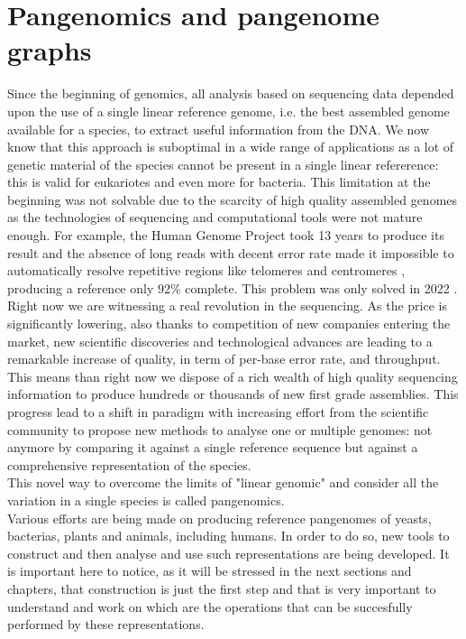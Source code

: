\section{Pangenomics and pangenome graphs}
Since the beginning of genomics, all analysis based on sequencing data depended upon the use of a single linear reference genome, i.e. the best assembled genome available for a species, to extract useful information from the DNA. We now know that this approach is suboptimal in a wide range of applications as a lot of genetic material of the species cannot be present in a single linear refererence: this is valid for eukariotes and even more for bacteria.  
This limitation at the beginning was not solvable due to the scarcity of high quality assembled genomes as the technologies of sequencing and computational tools were not mature enough. For example, the Human Genome Project took 13 years to produce its result \cite{humangenomeproject} and the absence of long reads with decent error rate made it impossible to automatically resolve repetitive regions like telomeres and centromeres \cite{human-pangenomics-era}, producing a reference only $92\%$ complete\cite{t2t}. This problem was only solved in 2022 \cite{t2t}. \\
Right now we are witnessing a real revolution in the sequencing. As the price is significantly lowering, also thanks to competition of new companies entering the market, new scientific discoveries and technological advances are leading to a remarkable increase of quality, in term of per-base error rate, and throughput. This means than right now we dispose of a rich wealth of high quality sequencing information to produce hundreds or thousands of new first grade assemblies.
This progress lead to a shift in paradigm with increasing effort from the scientific community to propose new methods to analyse one or multiple genomes: not anymore by comparing it against a single reference sequence but against a comprehensive representation of the species. \\
This novel way to overcome the limits of "linear genomic" and consider all the variation in a single species is called pangenomics. \\
Various efforts are being made on producing reference pangenomes of yeasts, bacterias, plants and animals, including humans. In order to do so, new tools to construct and then analyse and use such representations are being developed. 
It is important here to notice, as it will be stressed in the next sections and chapters, that construction is just the first step and that is very important to understand and work on which are the operations that can be succesfully performed by these representations. 

